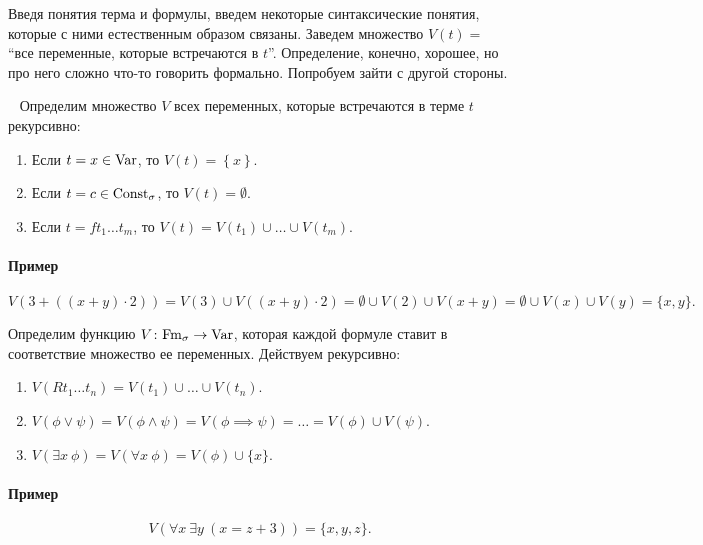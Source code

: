 Введя понятия терма и формулы, введем некоторые синтаксические понятия, которые с ними естественным образом связаны.
Заведем множество $V(t) = $ \enquote{все переменные, которые встречаются в $t$}.
Определение, конечно, хорошее, но про него сложно что-то говорить формально.
Попробуем зайти с другой стороны.
\begin{definition}~
    Определим множество $V$ всех переменных, которые встречаются в терме $t$ рекурсивно:
    \begin{enumerate}
        \item Если $t = x \in \mathrm{Var}$, то $V(t) = \left\{x\right\}$.
        \item Если $t = c \in \mathrm{Const}_{\sigma}$, то $V(t) = \emptyset$.
        \item Если $t = f t_{1} \ldots t_{m}$, то $V(t) = V(t_{1}) \cup \ldots \cup V(t_{m})$.
    \end{enumerate}
\end{definition}

\paragraph{Пример}
$$
    V(3 + ((x + y) \cdot 2)) = V(3) \cup V((x + y) \cdot 2) = \emptyset \cup V(2) \cup V(x + y) = \emptyset \cup V(x) \cup V(y) = \{x, y\}.
$$

\begin{definition}
    Определим функцию $V \colon \mathrm{Fm}_{\sigma} \to \mathrm{Var}$, которая каждой формуле ставит в соответствие множество ее переменных.
    Действуем рекурсивно:
    \begin{enumerate}
        \item $V(R t_{1} \ldots t_{n}) = V(t_{1}) \cup \ldots \cup V(t_{n})$.
        \item $V(\phi \lor \psi) = V(\phi \land \psi) = V(\phi \implies \psi) = \ldots = V(\phi) \cup V(\psi)$.
        \item $V(\exists x~\phi) = V(\forall x~\phi) = V(\phi) \cup \{x\}$.
    \end{enumerate}
\end{definition}

\paragraph{Пример}
$$
    V(\forall x~ \exists y~ (x = z + 3)) = \{x, y, z\}.
$$

